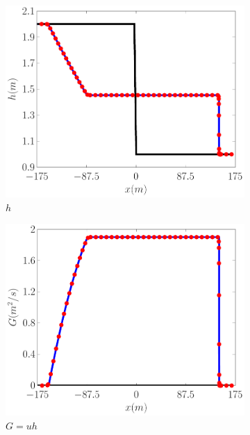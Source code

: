 \documentclass[10pt]{elsarticle}
\begin{document}
\begin{figure}
	\centering
	\begin{subfigure}{0.32\textwidth}
		\centering
		\includegraphics[width=\textwidth]{Figure-6a.pdf}
		\caption{$h$}
	\end{subfigure}
	\begin{subfigure}{0.32\textwidth}
		\centering
		\includegraphics[width=\textwidth]{Figure-6b.pdf}
		\caption{$G = uh$}
	\end{subfigure}
	\begin{subfigure}{0.32\textwidth}
		\centering

\end{subfigure}
\end{figure}
\end{document}
